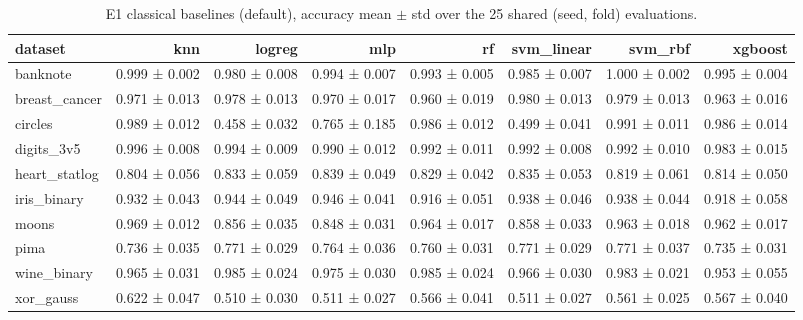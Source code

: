 \begin{table}[ht]
\centering
\caption{E1 classical baselines (default), accuracy mean $\pm$ std over the 25 shared (seed, fold) evaluations.}
\label{tab:e1-default-accuracy}
\begin{tabular}{lrrrrrrr}
\toprule
dataset & knn & logreg & mlp & rf & svm\_linear & svm\_rbf & xgboost \\
\midrule
banknote & 0.999 ± 0.002 & 0.980 ± 0.008 & 0.994 ± 0.007 & 0.993 ± 0.005 & 0.985 ± 0.007 & 1.000 ± 0.002 & 0.995 ± 0.004 \\
breast\_cancer & 0.971 ± 0.013 & 0.978 ± 0.013 & 0.970 ± 0.017 & 0.960 ± 0.019 & 0.980 ± 0.013 & 0.979 ± 0.013 & 0.963 ± 0.016 \\
circles & 0.989 ± 0.012 & 0.458 ± 0.032 & 0.765 ± 0.185 & 0.986 ± 0.012 & 0.499 ± 0.041 & 0.991 ± 0.011 & 0.986 ± 0.014 \\
digits\_3v5 & 0.996 ± 0.008 & 0.994 ± 0.009 & 0.990 ± 0.012 & 0.992 ± 0.011 & 0.992 ± 0.008 & 0.992 ± 0.010 & 0.983 ± 0.015 \\
heart\_statlog & 0.804 ± 0.056 & 0.833 ± 0.059 & 0.839 ± 0.049 & 0.829 ± 0.042 & 0.835 ± 0.053 & 0.819 ± 0.061 & 0.814 ± 0.050 \\
iris\_binary & 0.932 ± 0.043 & 0.944 ± 0.049 & 0.946 ± 0.041 & 0.916 ± 0.051 & 0.938 ± 0.046 & 0.938 ± 0.044 & 0.918 ± 0.058 \\
moons & 0.969 ± 0.012 & 0.856 ± 0.035 & 0.848 ± 0.031 & 0.964 ± 0.017 & 0.858 ± 0.033 & 0.963 ± 0.018 & 0.962 ± 0.017 \\
pima & 0.736 ± 0.035 & 0.771 ± 0.029 & 0.764 ± 0.036 & 0.760 ± 0.031 & 0.771 ± 0.029 & 0.771 ± 0.037 & 0.735 ± 0.031 \\
wine\_binary & 0.965 ± 0.031 & 0.985 ± 0.024 & 0.975 ± 0.030 & 0.985 ± 0.024 & 0.966 ± 0.030 & 0.983 ± 0.021 & 0.953 ± 0.055 \\
xor\_gauss & 0.622 ± 0.047 & 0.510 ± 0.030 & 0.511 ± 0.027 & 0.566 ± 0.041 & 0.511 ± 0.027 & 0.561 ± 0.025 & 0.567 ± 0.040 \\
\bottomrule
\end{tabular}
\end{table}
